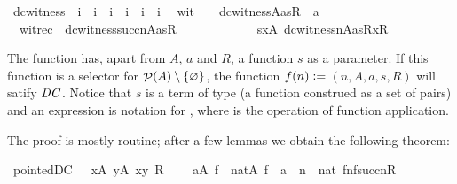\begin{isabelle}\isamarkuptrue%
\isamarkupfalse%
\ dc{\isacharunderscore}witness\ {\isacharcolon}{\isacharcolon}\ {\isachardoublequoteopen}i\ {\isasymRightarrow}\ i\ {\isasymRightarrow}\ i\ {\isasymRightarrow}\ i\ {\isasymRightarrow}\ i\ {\isasymRightarrow}\ i{\isachardoublequoteclose}\isanewline
{}\isamarkupfalse%
\isanewline
\ \ wit{}\ \ \ {\isacharcolon}\ {\isachardoublequoteopen}dc{\isacharunderscore}witness{\isacharparenleft}{}{\isacharcomma}A{\isacharcomma}a{\isacharcomma}s{\isacharcomma}R{\isacharparenright}\ {\isacharequal}\ a{\isachardoublequoteclose}\isanewline
\ \ witrec\ {\isacharcolon}\ {\isachardoublequoteopen}dc{\isacharunderscore}witness{\isacharparenleft}succ{\isacharparenleft}n{\isacharparenright}{\isacharcomma}A{\isacharcomma}a{\isacharcomma}s{\isacharcomma}R{\isacharparenright}\ {\isacharequal}\isanewline \ \ \ \ \ \ \ \ \ \  \ \ s{\isacharbackquote}{\isacharbraceleft}x{\isasymin}A{\isachardot}\ {\isasymlangle}dc{\isacharunderscore}witness{\isacharparenleft}n{\isacharcomma}A{\isacharcomma}a{\isacharcomma}s{\isacharcomma}R{\isacharparenright}{\isacharcomma}x{\isasymrangle}{\isasymin}R\ {\isacharbraceright}{\isachardoublequoteclose}
\end{isabelle}

The function  has, apart from $A$, $a$ and $R$, a
function $s$ as a parameter. If this function is a selector for
$\mathop{\mathcal{P}}(A)\setminus \{\varnothing\}$, the function $f(n)\mathrel{\mathop:}= {}$$(n,A,a,s,R)$
will satify $\mathit{DC}$. Notice that $s$ is a term of type  (a
function construed as a set of pairs) and an expression
 is notation for  ,
where
is the operation of function application.

The proof is mostly routine; after a few lemmas we obtain the
following theorem:

\begin{isabelle}
\isamarkupfalse%
\ pointed{\isacharunderscore}DC\ \ {\isacharcolon}\ {\isachardoublequoteopen}{\isacharparenleft}{\isasymforall}x{\isasymin}A{\isachardot}\ {\isasymexists}y{\isasymin}A{\isachardot}\ {\isasymlangle}x{\isacharcomma}y{\isasymrangle}{\isasymin}\ R{\isacharparenright}\ {\isasymLongrightarrow}\isanewline
     \ \ \ {\isasymforall}a{\isasymin}A{\isachardot}\ {\isacharparenleft}{\isasymexists}f\ {\isasymin}\ nat{\isasymrightarrow}A{\isachardot}\ f{\isacharbackquote}{}\ {\isacharequal}\ a\ {\isasymand}\ {\isacharparenleft}{\isasymforall}n\ {\isasymin}\ nat{\isachardot}\ {\isasymlangle}f{\isacharbackquote}n{\isacharcomma}f{\isacharbackquote}succ{\isacharparenleft}n{\isacharparenright}{\isasymrangle}{\isasymin}R{\isacharparenright}{\isacharparenright}{\isachardoublequoteclose}
\end{isabelle}

